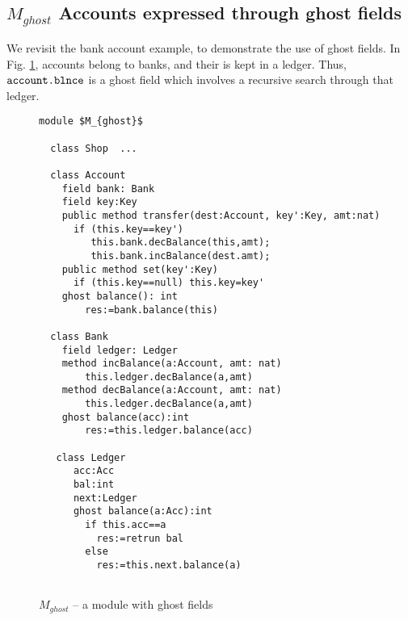 \subsection{ $M_{ghost}$ Accounts expressed through ghost fields}

\label{app:BankAccount:ghost}

 
We   revisit the bank account example, to demonstrate the use of ghost fields.
In Fig. \ref{f:ex-bank-short}, accounts belong to banks, and their \prg{\balance} is  kept in a ledger. 
Thus, $\mbox{\normalfont{\texttt{account.\mbox{\normalfont{\texttt{blnce}}}}}}$ is a ghost field which involves a recursive search through that ledger.


\begin{figure}[h]
\begin{lstlisting}[language=chainmail, mathescape=true, frame=lines]
module $M_{ghost}$ 
  
  class Shop  ...
  
  class Account
    field bank: Bank
    field key:Key
    public method transfer(dest:Account, key':Key, amt:nat)
      if (this.key==key') 
         this.bank.decBalance(this,amt); 
         this.bank.incBalance(dest.amt);
    public method set(key':Key)
      if (this.key==null) this.key=key'
    ghost balance(): int
        res:=bank.balance(this)
        
  class Bank
    field ledger: Ledger
    method incBalance(a:Account, amt: nat)
        this.ledger.decBalance(a,amt)
    method decBalance(a:Account, amt: nat)
        this.ledger.decBalance(a,amt)   
    ghost balance(acc):int 
        res:=this.ledger.balance(acc)
        
   class Ledger
      acc:Acc
      bal:int
      next:Ledger
      ghost balance(a:Acc):int 
        if this.acc==a 
          res:=retrun bal
        else
          res:=this.next.balance(a)
      
\end{lstlisting}
\caption{$M_{ghost}$  -- a module with ghost fields}
\label{f:ex-bank-short}
\end{figure}
 
 

